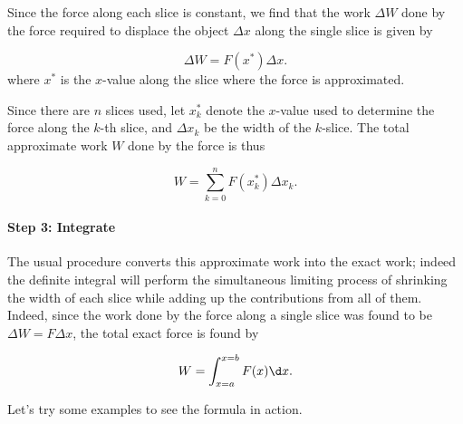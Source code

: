 \documentclass{ximera}
\begin{document}
\begin{model}
\begin{multipleChoice}
\end{multipleChoice}

Since the force along each slice is constant, we find that the work $\Delta W$ done by the force required to displace the object $\Delta x$ along the single slice is given by 

\[
\Delta W = F(x^*) \Delta x.
\]
where $x^*$ is the $x$-value along the slice where the force is approximated.

Since there are $n$ slices used, let $x^*_k$ denote the $x$-value used to determine the force along the $k$-th slice, and $\Delta x_k$ be the width of the $k$-slice.  The total approximate work $W$ done by the force is thus

\[
W = \sum_{k=0}^n F(x_k^*) \Delta x_k.
\]

\paragraph{Step 3: Integrate}  The usual procedure converts this approximate work into the exact work; indeed the definite integral will perform the simultaneous limiting process of shrinking the width of each slice while adding up the contributions from all of them.  Indeed, since the work done by the force along a single slice was found to be $\Delta W =F \Delta x$, the total exact force is found by

\[
W = \int_{x=a}^{x=b} F(x)  \d x.
\]

\end{model}



Let's try some examples to see the formula in action.
\end{document}
